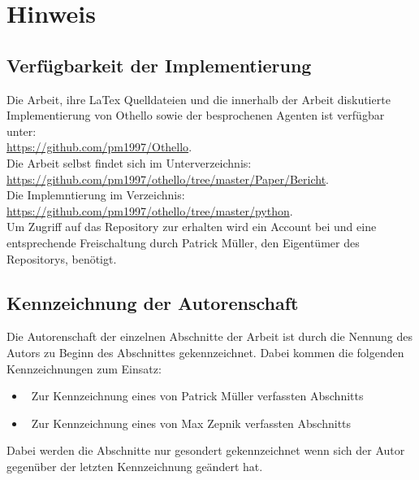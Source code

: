 \chapter*{Hinweis}
\section*{Verfügbarkeit der Implementierung}
Die Arbeit, ihre LaTex Quelldateien und die innerhalb der Arbeit diskutierte Implementierung von Othello sowie der besprochenen Agenten ist verfügbar unter: 
\\\href{https://github.com/pm1997/Othello}{https://github.com/pm1997/Othello}.
\\Die Arbeit selbst findet sich im Unterverzeichnis:
\\\href{https://github.com/pm1997/othello/tree/master/Paper/Bericht}{https://github.com/pm1997/othello/tree/master/Paper/Bericht}.
\\Die Implemntierung im Verzeichnis:
\\\href{https://github.com/pm1997/othello/tree/master/python}{https://github.com/pm1997/othello/tree/master/python}.
\\Um Zugriff auf das Repository zur erhalten wird ein Account bei  und eine entsprechende Freischaltung durch Patrick Müller, den Eigentümer des Repositorys, benötigt.

\section*{Kennzeichnung der Autorenschaft}
Die Autorenschaft der einzelnen Abschnitte der Arbeit ist durch die Nennung des Autors zu Beginn des Abschnittes gekennzeichnet. Dabei kommen die folgenden Kennzeichnungen zum Einsatz:
\begin{itemize}
\item \authorpatrick\ Zur Kennzeichnung eines von Patrick Müller verfassten Abschnitts
\item \authormax\ Zur Kennzeichnung eines von Max Zepnik verfassten Abschnitts
\end{itemize}
Dabei werden die Abschnitte nur gesondert gekennzeichnet wenn sich der Autor gegenüber der letzten Kennzeichnung geändert hat.  